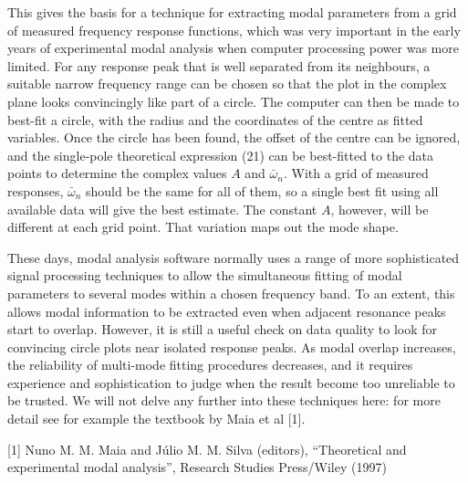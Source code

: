   This gives the basis for a technique for extracting modal parameters from a 
  grid of measured frequency response functions, which was very important in 
  the early years of experimental modal analysis when computer processing power 
  was more limited. For any response peak that is well separated from its 
  neighbours, a suitable narrow frequency range can be chosen so that the plot 
  in the complex plane looks convincingly like part of a circle. The computer 
  can then be made to best-fit a circle, with the radius and the coordinates of 
  the centre as fitted variables. Once the circle has been found, the offset of 
  the centre can be ignored, and the single-pole theoretical expression (21) 
  can be best-fitted to the data points to determine the complex values $A$ and 
  $\bar{\omega}_n$. With a grid of measured responses, $\bar{\omega}_n$ should 
  be the same for all of them, so a single best fit using all available data 
  will give the best estimate. The constant $A$, however, will be different at 
  each grid point. That variation maps out the mode shape. 

  These days, modal analysis software normally uses a range of more 
  sophisticated signal processing techniques to allow the simultaneous fitting 
  of modal parameters to several modes within a chosen frequency band. To an 
  extent, this allows modal information to be extracted even when adjacent 
  resonance peaks start to overlap. However, it is still a useful check on data 
  quality to look for convincing circle plots near isolated response peaks. As 
  modal overlap increases, the reliability of multi-mode fitting procedures 
  decreases, and it requires experience and sophistication to judge when the 
  result become too unreliable to be trusted. We will not delve any further 
  into these techniques here: for more detail see for example the textbook by 
  Maia et al [1]. 

  \sectionreferences{}[1] Nuno M. M. Maia and Júlio M. M. Silva (editors), 
  “Theoretical and experimental modal analysis”, Research Studies Press/Wiley 
  (1997) 